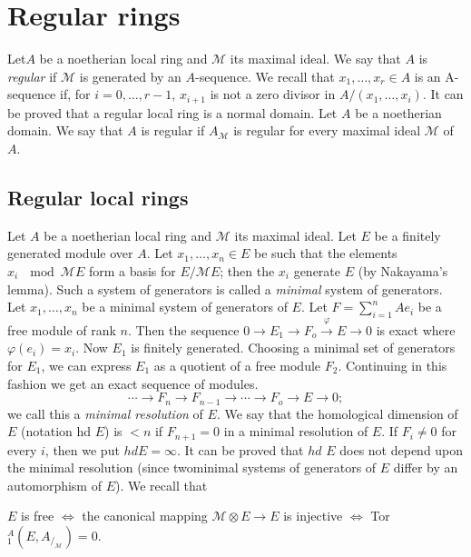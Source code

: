 \chapter{Regular rings}\label{chap2}%
    
Let\pageoriginale $A$ be a noetherian local ring and $\mathscr{M}$ its
maximal 
ideal. We say that $A$ is \textit{regular} if $\mathscr{M}$ is
generated by an $A$-sequence. We recall that $x_1, \ldots , x_r \in A$
is an A-sequence if, for $i = 0, \ldots , r- 1$, $x_{i +1}$ is not a
zero divisor in $A/(x_1, \ldots , x_i)$. It can be proved that a
regular local ring is a normal domain. Let $A$ be a noetherian
domain. We say that $A$ is regular if $A_\mathscr{M}$ is regular for
every maximal ideal $\mathscr{M}$ of $A$. 


\section{Regular local rings}\label{chap2:sec1} %
 
Let $A$ be a noetherian local ring and $\mathscr{M}$ its maximal
ideal. Let $E$ be a finitely generated module over $A$. Let $x_1,
\ldots , x_n \in E$ be such that the elements $x_i ~ \mod \mathscr{M}
E$ form a basis for $E/\mathscr{M} E$; then the $x_i $ generate
$E$ (by Nakayama's lemma). Such a system of generators is called a
\textit{minimal} system of generators. Let $x_1, \ldots , x_n$ be a
minimal system of generators of $E$. Let $F = \sum\limits_{i = 1}^n
Ae_i$ be a free module of rank $n$. Then the sequence $0 \rightarrow
E_1 \rightarrow F_o \xrightarrow{\varphi} E \rightarrow 0$ is exact
where $\varphi (e_i) = x_i$. Now $E_1$ is finitely generated. Choosing
a minimal set of generators for $E_1$, we can express $E_1$ as a
quotient of a  free module $F_2$. Continuing in this fashion we get an
exact sequence of modules. 
$$
\cdots \rightarrow F_n \rightarrow F_{n-1} \rightarrow \cdots
\rightarrow F_o \rightarrow E \rightarrow 0; 
 $$
we call this a \textit{minimal resolution} of $E$. We say that the
homological dimension of $E$ (notation hd $E$) is $< n$ if $F_{n + 1}
= 0$ in a minimal resolution of $E$. If $F_i \neq 0$ for every $i$,
then we put $hd E = \infty$. It can be  proved that $hd$ $E$ does not
depend upon the minimal resolution (since two\pageoriginale minimal
systems of generators of $E$ differ by an automorphism of $E$). We
recall that  
    
$E$ is free $\Leftrightarrow $ the canonical mapping $\mathscr{M}
\otimes E \rightarrow E$ is injective $\Leftrightarrow$ Tor $^A_1 (E,
A_{/_{\mathscr{M}}} ) = 0$. 
    
